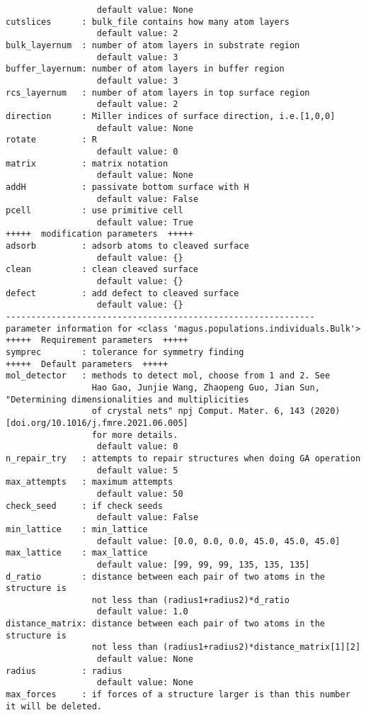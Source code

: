 \documentclass[12pt,oneside]{book}
\begin{document}
\begin{tcolorbox}
\begin{verbatim}
                  default value: None
cutslices      : bulk_file contains how many atom layers
                  default value: 2
bulk_layernum  : number of atom layers in substrate region
                  default value: 3
buffer_layernum: number of atom layers in buffer region
                  default value: 3
rcs_layernum   : number of atom layers in top surface region
                  default value: 2
direction      : Miller indices of surface direction, i.e.[1,0,0]
                  default value: None
rotate         : R
                  default value: 0
matrix         : matrix notation
                  default value: None
addH           : passivate bottom surface with H
                  default value: False
pcell          : use primitive cell
                  default value: True
+++++  modification parameters  +++++
adsorb         : adsorb atoms to cleaved surface
                  default value: {}
clean          : clean cleaved surface
                  default value: {}
defect         : add defect to cleaved surface
                  default value: {}
-------------------------------------------------------------
parameter information for <class 'magus.populations.individuals.Bulk'>
+++++  Requirement parameters  +++++
symprec        : tolerance for symmetry finding
+++++  Default parameters  +++++
mol_detector   : methods to detect mol, choose from 1 and 2. See
                 Hao Gao, Junjie Wang, Zhaopeng Guo, Jian Sun, "Determining dimensionalities and multiplicities
                 of crystal nets" npj Comput. Mater. 6, 143 (2020) [doi.org/10.1016/j.fmre.2021.06.005]
                 for more details.
                  default value: 0
n_repair_try   : attempts to repair structures when doing GA operation
                  default value: 5
max_attempts   : maximum attempts
                  default value: 50
check_seed     : if check seeds
                  default value: False
min_lattice    : min_lattice
                  default value: [0.0, 0.0, 0.0, 45.0, 45.0, 45.0]
max_lattice    : max_lattice
                  default value: [99, 99, 99, 135, 135, 135]
d_ratio        : distance between each pair of two atoms in the structure is
                 not less than (radius1+radius2)*d_ratio
                  default value: 1.0
distance_matrix: distance between each pair of two atoms in the structure is
                 not less than (radius1+radius2)*distance_matrix[1][2]
                  default value: None
radius         : radius
                  default value: None
max_forces     : if forces of a structure larger is than this number it will be deleted.

\end{verbatim}
\end{tcolorbox}
\end{document}
